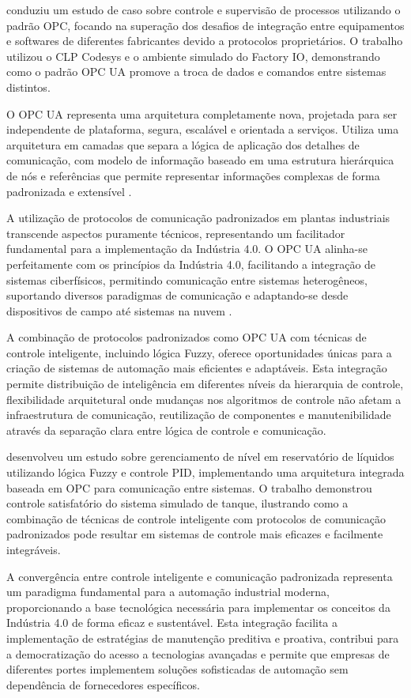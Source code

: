 \cite{souza2024} conduziu um estudo de caso sobre controle e supervisão de processos utilizando o padrão OPC, focando na superação dos desafios de integração entre equipamentos e softwares de diferentes fabricantes devido a protocolos proprietários. O trabalho utilizou o CLP Codesys e o ambiente simulado do Factory IO, demonstrando como o padrão OPC UA promove a troca de dados e comandos entre sistemas distintos.

O OPC UA representa uma arquitetura completamente nova, projetada para ser independente de plataforma, segura, escalável e orientada a serviços. Utiliza uma arquitetura em camadas que separa a lógica de aplicação dos detalhes de comunicação, com modelo de informação baseado em uma estrutura hierárquica de nós e referências que permite representar informações complexas de forma padronizada e extensível \cite{leitner2006}.

A utilização de protocolos de comunicação padronizados em plantas industriais transcende aspectos puramente técnicos, representando um facilitador fundamental para a implementação da Indústria 4.0. O OPC UA alinha-se perfeitamente com os princípios da Indústria 4.0, facilitando a integração de sistemas ciberfísicos, permitindo comunicação entre sistemas heterogêneos, suportando diversos paradigmas de comunicação e adaptando-se desde dispositivos de campo até sistemas na nuvem \cite{jasperneite2012}.

A combinação de protocolos padronizados como OPC UA com técnicas de controle inteligente, incluindo lógica Fuzzy, oferece oportunidades únicas para a criação de sistemas de automação mais eficientes e adaptáveis. Esta integração permite distribuição de inteligência em diferentes níveis da hierarquia de controle, flexibilidade arquitetural onde mudanças nos algoritmos de controle não afetam a infraestrutura de comunicação, reutilização de componentes e manutenibilidade através da separação clara entre lógica de controle e comunicação.

\cite{oliveira2023} desenvolveu um estudo sobre gerenciamento de nível em reservatório de líquidos utilizando lógica Fuzzy e controle PID, implementando uma arquitetura integrada baseada em OPC para comunicação entre sistemas. O trabalho demonstrou controle satisfatório do sistema simulado de tanque, ilustrando como a combinação de técnicas de controle inteligente com protocolos de comunicação padronizados pode resultar em sistemas de controle mais eficazes e facilmente integráveis.

A convergência entre controle inteligente e comunicação padronizada representa um paradigma fundamental para a automação industrial moderna, proporcionando a base tecnológica necessária para implementar os conceitos da Indústria 4.0 de forma eficaz e sustentável. Esta integração facilita a implementação de estratégias de manutenção preditiva e proativa, contribui para a democratização do acesso a tecnologias avançadas e permite que empresas de diferentes portes implementem soluções sofisticadas de automação sem dependência de fornecedores específicos.

